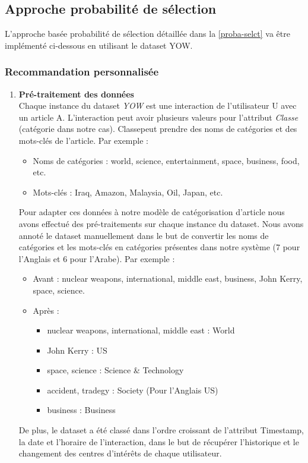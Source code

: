     \subsection{Approche probabilité de sélection}  
    L'approche basée probabilité de sélection détaillée dans la \autoref{proba-selct} va être implémenté ci-dessous en utilisant le dataset \textquotedbl YOW\textquotedbl.
        \subsubsection{Recommandation personnalisée}
        \begin{enumerate}[leftmargin=*]
            \item\textbf{Pré-traitement des données}\\
            Chaque instance du dataset \emph{YOW} est une interaction de l'utilisateur U avec un article A. L'interaction peut avoir plusieurs valeurs pour l'attribut \emph{Classe} (catégorie dans notre cas). \textquotedbl Classe\textquotedbl peut prendre des noms de catégories et des mots-clés de l'article. Par exemple :
            \begin{itemize}
                \item Noms de catégories : world, science, entertainment, space, business, food, etc.
                \item Mots-clés : Iraq, Amazon, Malaysia, Oil, Japan, etc.\\ 
            \end{itemize}
            Pour adapter ces données à notre modèle de catégorisation d'article nous avons effectué des pré-traitements sur chaque instance du dataset. Nous avons annoté le dataset manuellement dans le but de convertir les noms de catégories et les mots-clés en catégories présentes dans notre système (7 pour l'Anglais et 6 pour l'Arabe). Par exemple :
            \begin{itemize}
                \item Avant : nuclear weapons, international, middle east, business, John Kerry, space, science.
                \item Après :
                \begin{itemize}
                    \item {nuclear weapons, international, middle east} : World
                    \item {John Kerry} : US
                    \item {space, science} : Science \& Technology
                    \item {accident, tradegy} : Society (Pour l'Anglais US)
                    \item {business} : Business\\
                \end{itemize}    
            \end{itemize}
            De plus, le dataset a été classé dans l'ordre croissant de l'attribut \textquotedbl Timestamp\textquotedbl, la date et l'horaire de l'interaction, dans le but de récupérer l'historique et le changement des centres d’intérêts de chaque utilisateur. 


\end{enumerate}
